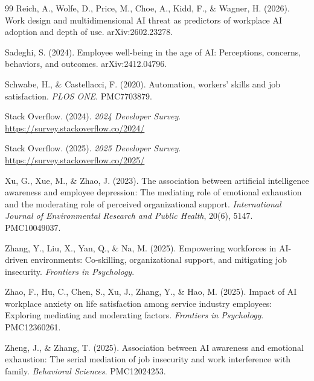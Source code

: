 \documentclass[11pt]{article}
\begin{document}
\begin{thebibliography}{99}
Reich, A., Wolfe, D., Price, M., Choe, A., Kidd, F., \& Wagner, H. (2026).
Work design and multidimensional AI threat as predictors of workplace AI adoption and depth of use.
arXiv:2602.23278.

Sadeghi, S. (2024).
Employee well-being in the age of AI: Perceptions, concerns, behaviors, and outcomes.
arXiv:2412.04796.

Schwabe, H., \& Castellacci, F. (2020).
Automation, workers' skills and job satisfaction.
\textit{PLOS ONE}.
PMC7703879.

Stack Overflow. (2024).
\textit{2024 Developer Survey}.
\url{https://survey.stackoverflow.co/2024/}

Stack Overflow. (2025).
\textit{2025 Developer Survey}.
\url{https://survey.stackoverflow.co/2025/}

Xu, G., Xue, M., \& Zhao, J. (2023).
The association between artificial intelligence awareness and employee depression:
The mediating role of emotional exhaustion and the moderating role of perceived organizational support.
\textit{International Journal of Environmental Research and Public Health}, 20(6), 5147.
PMC10049037.

Zhang, Y., Liu, X., Yan, Q., \& Na, M. (2025).
Empowering workforces in AI-driven environments: Co-skilling, organizational support,
and mitigating job insecurity.
\textit{Frontiers in Psychology}.

Zhao, F., Hu, C., Chen, S., Xu, J., Zhang, Y., \& Hao, M. (2025).
Impact of AI workplace anxiety on life satisfaction among service industry employees:
Exploring mediating and moderating factors.
\textit{Frontiers in Psychology}.
PMC12360261.

Zheng, J., \& Zhang, T. (2025).
Association between AI awareness and emotional exhaustion:
The serial mediation of job insecurity and work interference with family.
\textit{Behavioral Sciences}.
PMC12024253.

\end{thebibliography}
\end{document}
